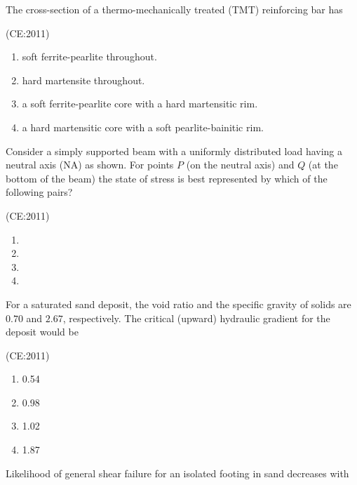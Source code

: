     \item 
	    The cross-section of a thermo-mechanically treated (TMT) reinforcing bar has

	    \hfill (CE:2011)
            \begin{enumerate}
            \item soft ferrite-pearlite throughout.
            \item hard martensite throughout.
            \item a soft ferrite-pearlite core with a hard martensitic rim.
            \item a hard martensitic core with a soft pearlite-bainitic rim.
        \end{enumerate}
    
    \item
	    Consider a simply supported beam with a uniformly distributed load having a neutral axis (NA) as shown. For points $P$ (on the neutral axis) and $Q$ (at the bottom of the beam) the state of stress is best represented by which of the following pairs? 

	    \begin{center}
		    
	    \end{center}

	    \hfill {(CE:2011)}
	    \begin{multicols}{2}
        \begin{enumerate}
	    \item 
	    \item  
	    \item  
	    \item  
        \end{enumerate}
	    \end{multicols}
	    
\item For a saturated sand deposit, the void ratio and the specific gravity of solids are $0.70$ and $2.67$, respectively. The critical (upward) hydraulic gradient for the deposit would be

    \hfill{(CE:2011)}
    \begin{multicols}{4}
        \begin{enumerate}
            \item 0.54
            \item 0.98
            \item 1.02
            \item 1.87
        \end{enumerate}
    \end{multicols}
    \vspace{1cm}
    \item Likelihood of general shear failure for an isolated footing in sand decreases with

